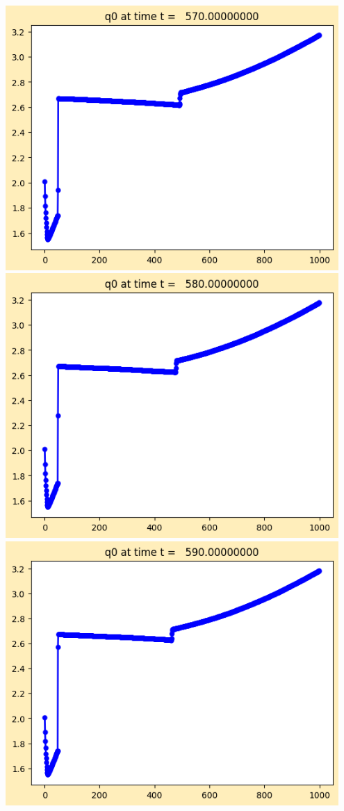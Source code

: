 \documentclass[11pt]{article}
\begin{document}
\vskip 10pt 
\includegraphics[width=0.95\textwidth]{frame0057fig1.png}
\vskip 10pt 
\includegraphics[width=0.95\textwidth]{frame0058fig1.png}
\vskip 10pt 
\includegraphics[width=0.95\textwidth]{frame0059fig1.png}
\end{document}
